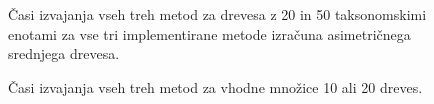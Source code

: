 \documentclass[a4paper, 12pt]{book}
\begin{document}
\clearpage
\begin{figure}[h!]
	\begin{center}
	\end{center}
	\caption{
		Časi izvajanja vseh treh metod za drevesa z 20 in 50 taksonomskimi enotami
	 	za vse tri implementirane metode izračuna asimetričnega srednjega drevesa. 
	}
	\label{img-eval-timing-trees}
\end{figure}
\begin{figure}[h!]
	\begin{center}
	\end{center}
	\caption{
		Časi izvajanja vseh treh metod za vhodne množice 10 ali 20 dreves.
	 }
	\label{img-eval-timing-taxons}
\end{figure}
\end{document}
